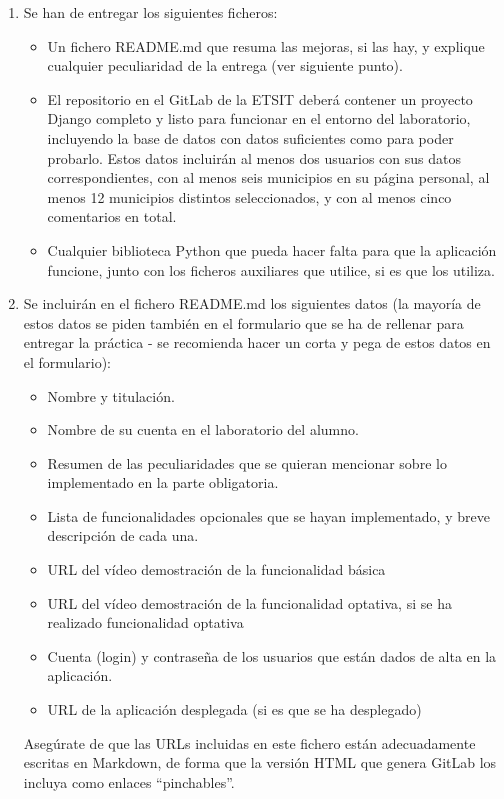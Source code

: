 \begin{enumerate}
  \item Se han de entregar los siguientes ficheros:

\begin{itemize}
  \item Un fichero README.md que resuma las mejoras, si las hay, y explique cualquier peculiaridad de la entrega (ver siguiente punto).
  \item El repositorio en el GitLab de la ETSIT deberá contener un proyecto Django completo y listo para funcionar en el entorno del laboratorio, incluyendo la base de datos con datos suficientes como para poder probarlo. Estos datos incluirán al menos dos usuarios con sus datos correspondientes, con al menos seis municipios en su página personal, al menos 12 municipios distintos seleccionados, y con al menos cinco comentarios en total.
  \item Cualquier biblioteca Python que pueda hacer falta para que la aplicación funcione, junto con los ficheros auxiliares que utilice, si es que los utiliza.
\end{itemize}

  \item Se incluirán en el fichero README.md los siguientes datos (la mayoría de estos datos se piden también en el formulario que se ha de rellenar para entregar la práctica - se recomienda hacer un corta y pega de estos datos en el formulario):

\begin{itemize}
  \item Nombre y titulación.
  \item Nombre de su cuenta en el laboratorio del alumno.
  \item Resumen de las peculiaridades que se quieran mencionar sobre lo implementado en la parte obligatoria.
  \item Lista de funcionalidades opcionales que se hayan implementado, y breve descripción de cada una.
  \item URL del vídeo demostración de la funcionalidad básica
  \item URL del vídeo demostración de la funcionalidad optativa, si se ha realizado funcionalidad optativa
  \item Cuenta (login) y contraseña de los usuarios que están dados de alta en la aplicación.
  \item URL de la aplicación desplegada (si es que se ha desplegado)
\end{itemize}

Asegúrate de que las URLs incluidas en este fichero están adecuadamente escritas en Markdown, de forma que la versión HTML que genera GitLab los incluya como enlaces ``pinchables''.

\end{enumerate}


